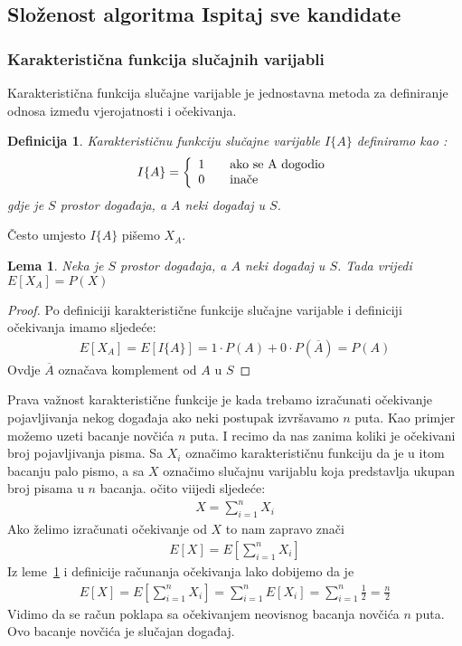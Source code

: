 \documentclass[10pt,a4paper]{article}
\newtheorem{definicija}{Definicija}
\newtheorem{lema}{Lema}
\begin{document}
\subsection{Složenost algoritma Ispitaj sve kandidate}
\subsubsection{Karakteristična funkcija slučajnih varijabli}
Karakteristična funkcija slučajne varijable je jednostavna metoda za definiranje odnosa između vjerojatnosti i očekivanja.
\begin{definicija}\label{definija_kfsv}
Karakterističnu funkciju slučajne varijable $I\{A\}$
definiramo kao :
\[ I\{A\} = \left\{ 
  \begin{array}{l l}
    1 & \quad \text{ako se A dogodio}\\
    0 & \quad \text{inače}
  \end{array} \right.\]
gdje je $S$ prostor događaja, a $A$ neki događaj u $S$.
\end{definicija}
Često umjesto $I\{A\}$ pišemo $X_A$.
\begin{lema}\label{lema_o_ocekivanju} 
Neka je $S$ prostor događaja, a $A$ neki događaj u $S$. Tada vrijedi $E[X_A]=P(X)$
\end{lema}
\begin{proof}
Po definiciji karakteristične funkcije slučajne varijable i definiciji očekivanja imamo sljedeće:
\begin{align*}
E[X_A] = E[I\{A\}] = 1\cdot P(A) + 0\cdot P(\overline{A}) = P(A) 
\end{align*}
Ovdje $\overline{A}$ označava komplement od $A$ u $S$
\end{proof}
Prava važnost karakteristične funkcije je kada trebamo izračunati očekivanje pojavljivanja nekog događaja ako neki postupak izvršavamo $n$ puta.
Kao primjer možemo uzeti bacanje novčića $n$ puta. I recimo da nas zanima koliki je očekivani broj pojavljivanja pisma. Sa $X_i$ označimo karakterističnu funkciju da je
u itom bacanju palo pismo, a sa $X$ označimo slučajnu varijablu koja predstavlja ukupan broj pisama u $n$ bacanja. očito viijedi sljedeće:
\begin{align*}
X = \sum_{i=1}^{n}X_i
\end{align*}
Ako želimo izračunati očekivanje od $X$ to nam zapravo znači
\begin{align*}
E[X] = E[\sum_{i = 1}^{n}X_i]
\end{align*}
Iz leme~\ref{lema_o_ocekivanju} i definicije računanja očekivanja lako dobijemo da je 
\begin{align*}
E[X] = E[\sum_{i = 1}^{n}X_i] = \sum_{i = 1}^{n}E[X_i] = \sum_{i = 1}^{n}\frac{1}{2} = \frac{n}{2}
\end{align*}
Vidimo da se račun poklapa sa očekivanjem neovisnog bacanja novčića $n$ puta. Ovo bacanje novčića je slučajan događaj.
\end{document}
